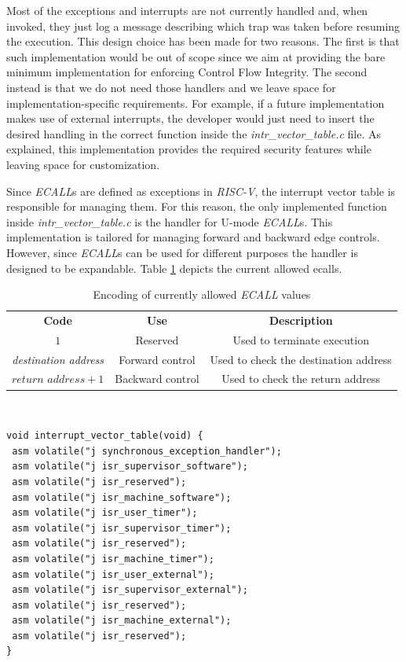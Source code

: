 Most of the exceptions and interrupts are not currently handled and, when invoked,
they just log a message describing which trap was taken before resuming the
execution. This design choice has been made for two reasons. The first is that
such implementation would be out of scope since we aim at providing the bare
minimum implementation for enforcing Control Flow Integrity. The second instead is
that we do not need those handlers and we leave space for implementation-specific
requirements. For example, if a future implementation makes use of external interrupts,
the developer would just need to insert the desired handling in the correct
function inside the \textit{intr\_vector\_table.c} file. As explained, this implementation
provides the required security features while leaving space for customization.

Since \textit{ECALL}s are defined as exceptions in \textit{RISC-V}, the interrupt
vector table is responsible for managing them. For this reason, the only implemented
function inside \textit{intr\_vector\_table.c} is the handler for U-mode \textit{ECALL}s.
This implementation is tailored for managing forward and backward edge controls.
However, since \textit{ECALL}s can be used for different purposes the handler is
designed to be expandable. Table \ref{tab:ecalls} depicts the current allowed
ecalls.
\begin{table}
  \centering
  \begin{tabular}{|c|c|c|}
    \hline
    \textbf{Code}                & \textbf{Use}     & \textbf{Description}                  \\
    \hhline{===} $1$             & Reserved         & Used to terminate execution           \\
    \hline
    \textit{destination address} & Forward control  & Used to check the destination address \\
    \hline
    $\textit{return address}+ 1$ & Backward control & Used to check the return address      \\
    \hline
  \end{tabular}
  \caption{Encoding of currently allowed \textit{ECALL} values}
  \label{tab:ecalls}
\end{table}
\\ \begin{lstlisting}[style=CStyle, caption = Interrput Vector Table, label={lst:intrtable}]
void interrupt_vector_table(void) {
 asm volatile("j synchronous_exception_handler");
 asm volatile("j isr_supervisor_software");
 asm volatile("j isr_reserved");
 asm volatile("j isr_machine_software");
 asm volatile("j isr_user_timer");
 asm volatile("j isr_supervisor_timer");
 asm volatile("j isr_reserved");
 asm volatile("j isr_machine_timer");
 asm volatile("j isr_user_external");
 asm volatile("j isr_supervisor_external");
 asm volatile("j isr_reserved");
 asm volatile("j isr_machine_external");
 asm volatile("j isr_reserved");
}
\end{lstlisting}

